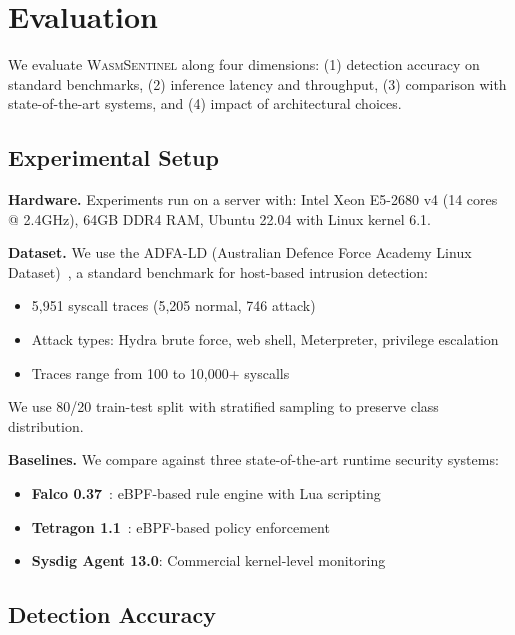
\section{Evaluation}
\label{sec:evaluation}

We evaluate \textsc{WasmSentinel} along four dimensions:
(1) detection accuracy on standard benchmarks,
(2) inference latency and throughput,
(3) comparison with state-of-the-art systems,
and (4) impact of architectural choices.

\subsection{Experimental Setup}

\textbf{Hardware.}
Experiments run on a server with:
Intel Xeon E5-2680 v4 (14 cores @ 2.4GHz),
64GB DDR4 RAM,
Ubuntu 22.04 with Linux kernel 6.1.

\textbf{Dataset.}
We use the ADFA-LD (Australian Defence Force Academy Linux Dataset)~\cite{adfa-ld}, a standard benchmark for host-based intrusion detection:
\begin{itemize}
    \item 5,951 syscall traces (5,205 normal, 746 attack)
    \item Attack types: Hydra brute force, web shell, Meterpreter, privilege escalation
    \item Traces range from 100 to 10,000+ syscalls
\end{itemize}

We use 80/20 train-test split with stratified sampling to preserve class distribution.

\textbf{Baselines.}
We compare against three state-of-the-art runtime security systems:
\begin{itemize}
    \item \textbf{Falco 0.37}~\cite{falco}: eBPF-based rule engine with Lua scripting
    \item \textbf{Tetragon 1.1}~\cite{tetragon}: eBPF-based policy enforcement
    \item \textbf{Sysdig Agent 13.0}: Commercial kernel-level monitoring
\end{itemize}

\subsection{Detection Accuracy}
\label{sec:eval-accuracy}

